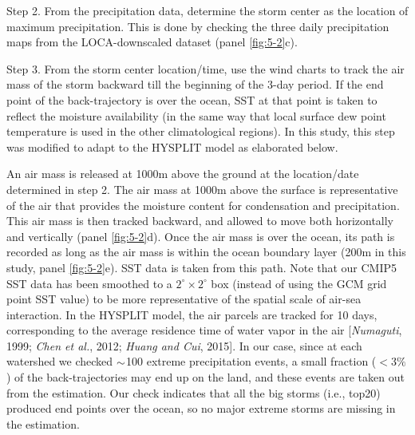 Step 2.  From the precipitation data, determine the storm center as the location of maximum precipitation. This is done by checking the three daily precipitation maps from the LOCA-downscaled dataset (panel \ref{fig:5-2}c).

Step 3. From the storm center location/time, use the wind charts to track the air mass of the storm backward till the beginning of the 3-day period. If the end point of the back-trajectory is over the ocean, SST at that point is taken to reflect the moisture availability (in the same way that local surface dew point temperature is used in the other climatological regions). In this study, this step was modified to adapt to the HYSPLIT model as elaborated below.

An air mass is released at 1000m above the ground at the location/date determined in step 2. The air mass at 1000m above the surface is representative of the air that provides the moisture content for condensation and precipitation. This air mass is then tracked backward, and allowed to move both horizontally and vertically (panel \ref{fig:5-2}d). Once the air mass is over the ocean, its path is recorded as long as the air mass is within the ocean boundary layer (200m in this study, panel \ref{fig:5-2}e). SST data is taken from this path. Note that our CMIP5 SST data has been smoothed to a $2^{\circ}\times2^{\circ}$ box (instead of using the GCM grid point SST value) to be more representative of the spatial scale of air-sea interaction. In the HYSPLIT model, the air parcels are tracked for 10 days, corresponding to the average residence time of water vapor in the air [\textit{Numaguti}, 1999; \textit{Chen et al.}, 2012; \textit{Huang and Cui}, 2015]. In our case, since at each watershed we checked $\scriptsize{\sim}$100 extreme precipitation events, a small fraction ($<3\%$) of the back-trajectories may end up on the land, and these events are taken out from the estimation. Our check indicates that all the big storms (i.e., top20) produced end points over the ocean, so no major extreme storms are missing in the estimation.

